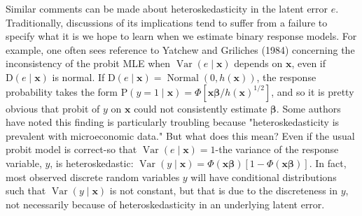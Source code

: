 \documentclass[10pt]{article}
\begin{document}
Similar comments can be made about heteroskedasticity in the latent error $e$. Traditionally, discussions of its implications tend to suffer from a failure to specify what it is we hope to learn when we estimate binary response models. For example, one often sees reference to Yatchew and Griliches (1984) concerning the inconsistency of the probit MLE when $\operatorname{Var}(e \mid \mathbf{x})$ depends on $\mathbf{x}$, even if $\mathrm{D}(e \mid \mathbf{x})$ is normal. If $\mathrm{D}(e \mid \mathbf{x})=\operatorname{Normal}(0, h(\mathbf{x}))$, the response probability takes the form $\mathrm{P}(y=1 \mid \mathbf{x})= \Phi\left[\mathbf{x} \boldsymbol{\beta} / h(\mathbf{x})^{1 / 2}\right]$, and so it is pretty obvious that probit of $y$ on $\mathbf{x}$ could not consistently estimate $\boldsymbol{\beta}$. Some authors have noted this finding is particularly troubling because "heteroskedasticity is prevalent with microeconomic data." But what does this mean? Even if the usual probit model is correct-so that $\operatorname{Var}(e \mid \mathbf{x})=1$-the variance of the response variable, $y$, is heteroskedastic: $\operatorname{Var}(y \mid \mathbf{x})=\Phi(\mathbf{x} \boldsymbol{\beta})[1-\Phi(\mathbf{x} \boldsymbol{\beta})]$. In fact, most observed discrete random variables $y$ will have conditional distributions such that $\operatorname{Var}(y \mid \mathbf{x})$ is not constant, but that is due to the discreteness in $y$, not necessarily because of heteroskedasticity in an underlying latent error.
\end{document}
